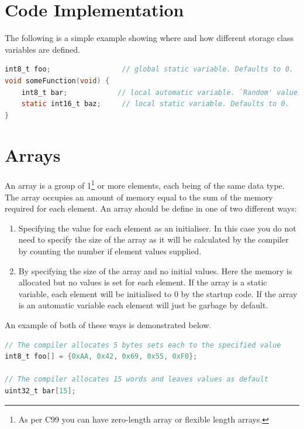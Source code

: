 \section{Code Implementation}
The following is a simple example showing where and how different storage class variables are defined.

\begin{lstlisting}[language=C]
int8_t foo;                 // global static variable. Defaults to 0.
void someFunction(void) {
    int8_t bar;            // local automatic variable. `Random' value.
    static int16_t baz;     // local static variable. Defaults to 0.
}
\end{lstlisting}


\section{Arrays}
An array is a group of 1\footnote{As per C99 you can have zero-length array or flexible length arrays.} or more elements, each being of the same data type.
The array occupies an amount of memory equal to the sum of the memory required for each element. An array should be define in one of two different ways:
\begin{enumerate}
    \item Specifying the value for each element as an initialiser. In this case you do not need to specify the size of the array as it will be calculated by the compiler by counting the number if element values supplied.
    \item By specifying the size of the array and no initial values. Here the memory is allocated but no values is set for each element. If the array is a static variable, each element will be initialised to 0 by the startup code. If the array is an automatic variable each element will just be garbage by default. 
\end{enumerate}

An example of both of these ways is demonstrated below.


\begin{lstlisting}[language=C]
// The compiler allocates 5 bytes sets each to the specified value
int8_t foo[] = {0xAA, 0x42, 0x69, 0x55, 0xF0};

// The compiler allocates 15 words and leaves values as default
uint32_t bar[15];
\end{lstlisting}

